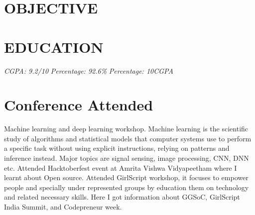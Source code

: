 \documentclass[11pt,a4paper,sans]{moderncv}        %
\begin{document}
\makecvtitle

\section{OBJECTIVE}

\section{EDUCATION}
{\textit{CGPA: 9.2/10}}{}  %
{\textit{Percentage: 92.6\%  }}{}  %
{\textit{Percentage: 10CGPA  }}{}  %

\section{Conference Attended}
{Machine learning and deep learning workshop. Machine learning is the scientific study of algorithms and statistical models that computer systems use to perform a specific task without using explicit instructions, relying on patterns and inference instead. Major topics are signal sensing, image processing, CNN, DNN etc.}
{Attended Hacktoberfest event at Amrita Vishwa Vidyapeetham where I learnt about Open source.}
{Attended GirlScript workshop, it focuses to empower people and specially under represented groups by education them on technology and related necessary skills. Here I got information about GGSoC, GirlScript India Summit, and Codepreneur week. }
\end{document}
